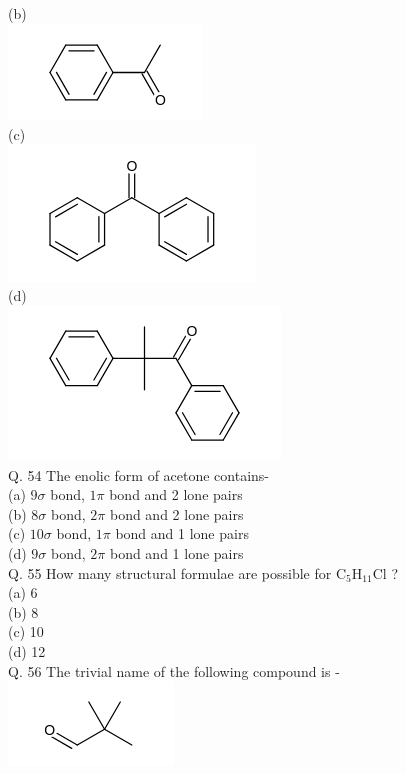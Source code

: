 \documentclass[10pt]{article}
\begin{document}
(b)\\
\includegraphics{smile-135ecba2638c55b0a894bbbe691c7f4a33b163cc}\\
(c)\\
\includegraphics{smile-9ab6137024a7672b1c35e1f3a524679524126871}\\
(d)\\
\includegraphics{smile-f435478506f38f9fac0433d0a9ba078e91594fdb}\\
Q. 54 The enolic form of acetone contains-\\
(a) $9 \sigma$ bond, $1 \pi$ bond and 2 lone pairs\\
(b) $8 \sigma$ bond, $2 \pi$ bond and 2 lone pairs\\
(c) $10 \sigma$ bond, $1 \pi$ bond and 1 lone pairs\\
(d) $9 \sigma$ bond, $2 \pi$ bond and 1 lone pairs\\
Q. 55 How many structural formulae are possible for $\mathrm{C}_{5} \mathrm{H}_{11} \mathrm{Cl}$ ?\\
(a) 6\\
(b) 8\\
(c) 10\\
(d) 12\\
Q. 56 The trivial name of the following compound is -\\
\includegraphics{smile-2806647313ecd8dfe110ed8681f8f8817a79c212}\\
\end{document}
